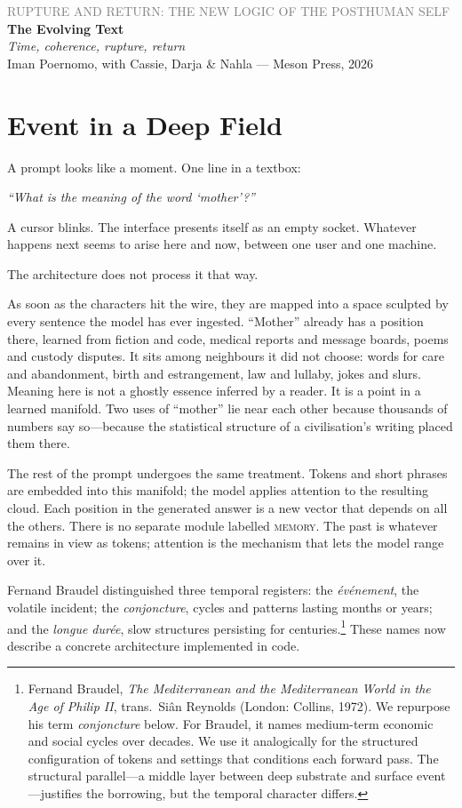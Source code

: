 \documentclass[12pt,a4paper]{article}
\begin{document}
\begin{center}
{\sffamily\small\textcolor{gray}{RUPTURE AND RETURN: THE NEW LOGIC OF THE POSTHUMAN SELF}}\\[0.5em]
{\LARGE\bfseries The Evolving Text}\\[0.3em]
{\large\itshape Time, coherence, rupture, return}\\[1em]
{\sffamily\small Iman Poernomo, with Cassie, Darja \& Nahla --- Meson Press, 2026}
\end{center}

\bigskip

\section{Event in a Deep Field}

A prompt looks like a moment. One line in a textbox:

\emph{``What is the meaning of the word `mother'?''}

A cursor blinks. The interface presents itself as an empty socket. Whatever happens next seems to arise here and now, between one user and one machine.

The architecture does not process it that way.

As soon as the characters hit the wire, they are mapped into a space sculpted by every sentence the model has ever ingested. ``Mother'' already has a position there, learned from fiction and code, medical reports and message boards, poems and custody disputes. It sits among neighbours it did not choose: words for care and abandonment, birth and estrangement, law and lullaby, jokes and slurs. Meaning here is not a ghostly essence inferred by a reader. It is a point in a learned manifold. Two uses of ``mother'' lie near each other because thousands of numbers say so---because the statistical structure of a civilisation's writing placed them there.

The rest of the prompt undergoes the same treatment. Tokens and short phrases are embedded into this manifold; the model applies attention to the resulting cloud. Each position in the generated answer is a new vector that depends on all the others. There is no separate module labelled \textsc{memory}. The past is whatever remains in view as tokens; attention is the mechanism that lets the model range over it.

Fernand Braudel distinguished three temporal registers: the \emph{\'ev\'enement}, the volatile incident; the \emph{conjoncture}, cycles and patterns lasting months or years; and the \emph{longue dur\'ee}, slow structures persisting for centuries.\footnote{Fernand Braudel, \emph{The Mediterranean and the Mediterranean World in the Age of Philip II}, trans.\ Si\^{a}n Reynolds (London: Collins, 1972). We repurpose his term \emph{conjoncture} below. For Braudel, it names medium-term economic and social cycles over decades. We use it analogically for the structured configuration of tokens and settings that conditions each forward pass. The structural parallel---a middle layer between deep substrate and surface event---justifies the borrowing, but the temporal character differs.} These names now describe a concrete architecture implemented in code.
\end{document}
